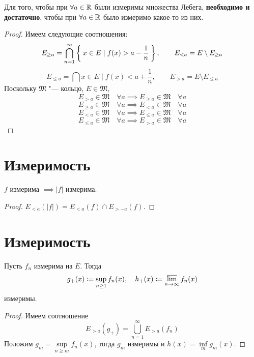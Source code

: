 \begin{theorem}
	Для того, чтобы при $ \forall a \in \mathbb{R} $ были измеримы множества Лебега, \textbf{необходимо и достаточно}, чтобы при $ \forall a \in \mathbb{R} $ было измеримо какое-то из них.
\end{theorem}

\begin{proof}
	Имеем следующие соотношения:
	$$ E_{\ge a} = \bigcap_{n = 1}^\infty \Set{x \in E \mid f(x) > a - \frac1n}, \qquad E_{<a} = E \setminus E_{\ge a} $$
	$$ E_{\le a} = \bigcap {x \in E \mid f(x) < a + \frac1n}, \qquad E_{>a} = E \setminus E_{\le a} $$
	Поскольку $ \mathfrak M $ "--- кольцо, $ E \in \mathfrak M $,
	$$ E_{>a} \in \mathfrak M \quad \forall a \implies E_{\ge a} \in \mathfrak M \quad \forall a $$
	$$ E_{\ge a} \in \mathfrak M \quad \forall a \implies E_{<a} \in \mathfrak M \quad \forall a $$
	$$ E_{<a} \in \mathfrak M \quad \forall a \implies E_{\le a} \in \mathfrak M \quad \forall a $$
	$$ E_{\le a} \in \mathfrak M \quad \forall a \implies E_{>a} \in \mathfrak M \quad \forall a $$
\end{proof}

\section{Измеримость }

\begin{property}
	$ f $ измерима $ \implies |f| $ измерима.
\end{property}

\begin{proof}
	$ E_{<a}(|f|) = E_{<a}(f) \cap E_{>-a}(f) $.
\end{proof}

\section{Измеримость }

\begin{property}\label{prop:meas_prop:2}
	Пусть $ f_n $ измерима на $ E $. Тогда
	$$ g_+(x) \coloneq \sup\limits_{n \ge 1} f_n(x), \quad h_+(x) \coloneq \varlimsup\limits_{n \to \infty} f_n(x) $$
	измеримы.
\end{property}

\begin{proof}
	Имеем соотношение
	$$ E_{>a}(g_+) = \bigcup_{n = 1}^\infty E_{>a}(f_n) $$
	Положим $ g_m = \sup\limits_{n \ge m} f_n(x) $, тогда $ g_m $ измеримы и $ h(x) = \inf\limits_m g_m(x) $.
\end{proof}

